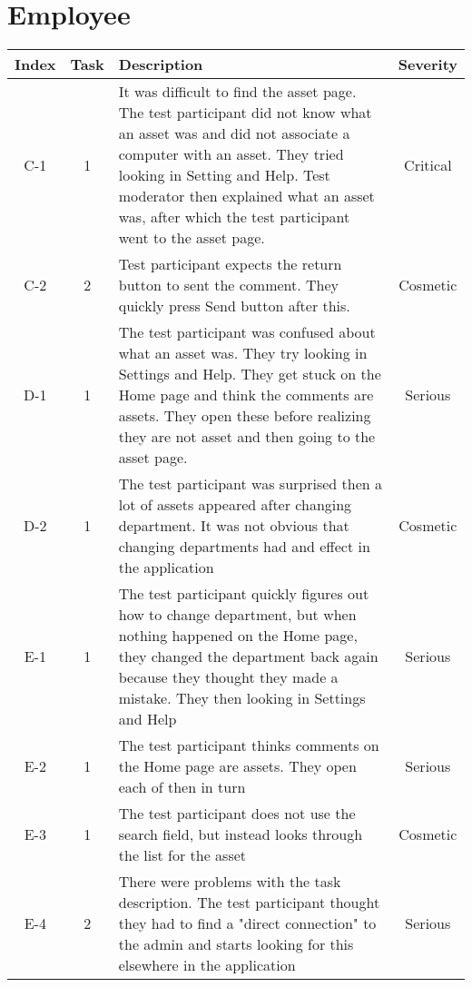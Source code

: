 \section*{Employee}
\begin{longtable}{| c | c | p{8cm} | c |}
        \hline
        \textbf{Index} & \textbf{Task} & \textbf{Description} & \textbf{Severity}
        \\
        \hline
        C-1 & 1 & It was difficult to find the asset page. The test participant did not know what an asset was and did not associate a computer with an asset. They tried looking in Setting and Help. Test moderator then explained what an asset was, after which the test participant went to the asset page. & Critical
        \\
        \hline
        C-2 & 2 & Test participant expects the return button to sent the comment. They quickly press Send button after this. & Cosmetic
        \\
        \hline
        D-1 & 1 & The test participant was confused about what an asset was. They try looking in Settings and Help. They get stuck on the Home page and think the comments are assets. They open these before realizing they are not asset and then going to the asset page. & Serious
        \\
        \hline
        D-2 & 1 & The test participant was surprised then a lot of assets appeared after changing department. It was not obvious that changing departments had and effect in the application & Cosmetic
        \\
        \hline
        E-1 & 1 & The test participant quickly figures out how to change department, but when nothing happened on the Home page, they changed the department back again because they thought they made a mistake. They then looking in Settings and Help & Serious
        \\
        \hline
        E-2 & 1 & The test participant thinks comments on the Home page are assets. They open each of then in turn & Serious
        \\
        \hline
        E-3 & 1 & The test participant does not use the search field, but instead looks through the list for the asset &  Cosmetic
        \\
        \hline
        E-4 & 2 & There were problems with the task description. The test participant thought they had to find a "direct connection" to the admin and starts looking for this elsewhere in the application & Serious
        \\
        \hline

\end{longtable}
